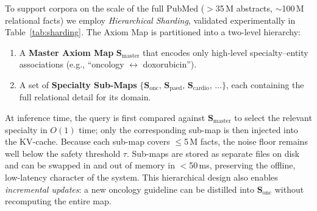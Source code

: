 \documentclass[11pt,a4paper]{article}
\begin{document}
To support corpora on the scale of the full PubMed ($>$35\,M abstracts,
$\sim$100\,M relational facts) we employ \emph{Hierarchical Sharding},
validated experimentally in Table~\ref{tab:sharding}.
The Axiom Map is partitioned into a two-level hierarchy:
\begin{enumerate}[nosep]
    \item A \textbf{Master Axiom Map} $\mathbf{S}_{\text{master}}$ that
          encodes only high-level specialty--entity associations (e.g.,
          ``oncology $\leftrightarrow$ doxorubicin'').
    \item A set of \textbf{Specialty Sub-Maps}
          $\{\mathbf{S}_{\text{onc}},\, \mathbf{S}_{\text{paed}},\,
          \mathbf{S}_{\text{cardio}},\, \ldots\}$, each
          containing the full relational detail for its domain.
\end{enumerate}
At inference time, the query is first compared against
$\mathbf{S}_{\text{master}}$ to select the relevant specialty in
$O(1)$ time; only the corresponding sub-map is then injected into the
KV-cache.  Because each sub-map covers $\leq$5\,M facts, the noise
floor remains well below the safety threshold $\tau$.  Sub-maps are
stored as separate files on disk and can be swapped in and out of
memory in $<$50\,ms, preserving the offline, low-latency character
of the system.  This hierarchical design also enables
\emph{incremental updates}: a new oncology guideline can be distilled
into $\mathbf{S}_{\text{onc}}$ without recomputing the entire map.
\end{document}
